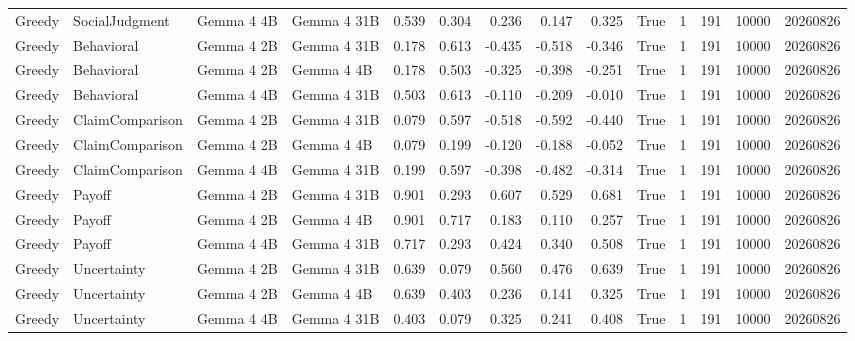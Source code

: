 \begin{tabular}{llllrrrrrrrrrr}
Greedy & SocialJudgment & Gemma 4 4B & Gemma 4 31B & 0.539 & 0.304 & 0.236 & 0.147 & 0.325 & True & 1 & 191 & 10000 & 20260826 \\
Greedy & Behavioral & Gemma 4 2B & Gemma 4 31B & 0.178 & 0.613 & -0.435 & -0.518 & -0.346 & True & 1 & 191 & 10000 & 20260826 \\
Greedy & Behavioral & Gemma 4 2B & Gemma 4 4B & 0.178 & 0.503 & -0.325 & -0.398 & -0.251 & True & 1 & 191 & 10000 & 20260826 \\
Greedy & Behavioral & Gemma 4 4B & Gemma 4 31B & 0.503 & 0.613 & -0.110 & -0.209 & -0.010 & True & 1 & 191 & 10000 & 20260826 \\
Greedy & ClaimComparison & Gemma 4 2B & Gemma 4 31B & 0.079 & 0.597 & -0.518 & -0.592 & -0.440 & True & 1 & 191 & 10000 & 20260826 \\
Greedy & ClaimComparison & Gemma 4 2B & Gemma 4 4B & 0.079 & 0.199 & -0.120 & -0.188 & -0.052 & True & 1 & 191 & 10000 & 20260826 \\
Greedy & ClaimComparison & Gemma 4 4B & Gemma 4 31B & 0.199 & 0.597 & -0.398 & -0.482 & -0.314 & True & 1 & 191 & 10000 & 20260826 \\
Greedy & Payoff & Gemma 4 2B & Gemma 4 31B & 0.901 & 0.293 & 0.607 & 0.529 & 0.681 & True & 1 & 191 & 10000 & 20260826 \\
Greedy & Payoff & Gemma 4 2B & Gemma 4 4B & 0.901 & 0.717 & 0.183 & 0.110 & 0.257 & True & 1 & 191 & 10000 & 20260826 \\
Greedy & Payoff & Gemma 4 4B & Gemma 4 31B & 0.717 & 0.293 & 0.424 & 0.340 & 0.508 & True & 1 & 191 & 10000 & 20260826 \\
Greedy & Uncertainty & Gemma 4 2B & Gemma 4 31B & 0.639 & 0.079 & 0.560 & 0.476 & 0.639 & True & 1 & 191 & 10000 & 20260826 \\
Greedy & Uncertainty & Gemma 4 2B & Gemma 4 4B & 0.639 & 0.403 & 0.236 & 0.141 & 0.325 & True & 1 & 191 & 10000 & 20260826 \\
Greedy & Uncertainty & Gemma 4 4B & Gemma 4 31B & 0.403 & 0.079 & 0.325 & 0.241 & 0.408 & True & 1 & 191 & 10000 & 20260826 \\
\bottomrule
\end{tabular}
